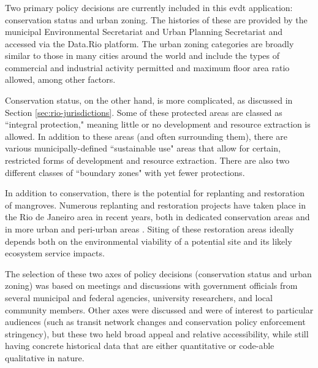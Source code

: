 \subsubsection{}

Two primary policy decisions are currently included in this \ac{evdt} application: conservation status and urban zoning. The histories of these are provided by the municipal Environmental Secretariat and Urban Planning Secretariat and accessed via the Data.Rio platform. The urban zoning categories are broadly similar to those in many cities around the world and include the types of commercial and industrial activity permitted and maximum floor area ratio allowed, among other factors. 

Conservation status, on the other hand, is more complicated, as discussed in Section \ref{sec:rio-jurisdictions}. Some of these protected areas are classed as ``integral protection," meaning little or no development and resource extraction is allowed. In addition to these areas (and often surrounding them), there are various municipally-defined ``sustainable use" areas that allow for certain, restricted forms of development and resource extraction. There are also two different classes of ``boundary zones" with yet fewer protections.

In addition to conservation, there is the potential for replanting and restoration of mangroves. Numerous replanting and restoration projects have taken place in the Rio de Janeiro area in recent years, both in dedicated conservation areas \cite{granadoAssessingGeneticDiversity2018} and in more urban and peri-urban areas \cite{rioprefeituraEnvironmentalRecoveryRodrigo2019, soaresEstruturaVegetalGrau1999}. Siting of these restoration areas ideally depends both on the environmental viability of a potential site and its likely ecosystem service impacts.

The selection of these two axes of policy decisions (conservation status and urban zoning) was based on meetings and discussions with government officials from several municipal and federal agencies, university researchers, and local community members. Other axes were discussed and were of interest to particular audiences (such as transit network changes and conservation policy enforcement stringency), but these two held broad appeal and relative accessibility, while still having concrete historical data that are either quantitative or code-able qualitative in nature. 



